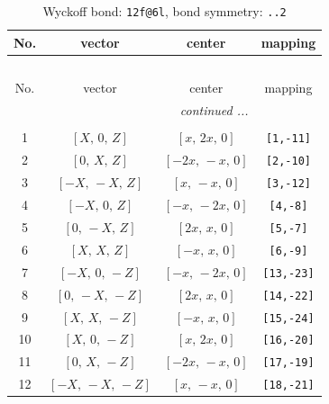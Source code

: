 \documentclass[fleqn,8pt]{jsarticle}
\begin{document}
\begin{longtable}{cccc}
\caption{Wyckoff bond: {\tt 12f@6l}, bond symmetry: {\tt ..2}}
 \\
 \hline \hline
No. & vector & center & mapping \\ \hline \endfirsthead

\multicolumn{3}{l}{\tablename\ \thetable{}} \\
 \hline \hline
No. & vector & center & mapping \\ \hline \endhead

 \hline \hline
\multicolumn{3}{r}{\footnotesize\it continued ...} \\ \endfoot

 \hline \hline
\multicolumn{3}{r}{} \\ \endlastfoot

1 & $\left[ X,\, 0,\, Z \right]$ & $\left[ x,\, 2 x,\, 0 \right]$ & {\tt [1,-11]} \\ \hline
2 & $\left[ 0,\, X,\, Z \right]$ & $\left[ - 2 x,\, - x,\, 0 \right]$ & {\tt [2,-10]} \\ \hline
3 & $\left[ - X,\, - X,\, Z \right]$ & $\left[ x,\, - x,\, 0 \right]$ & {\tt [3,-12]} \\ \hline
4 & $\left[ - X,\, 0,\, Z \right]$ & $\left[ - x,\, - 2 x,\, 0 \right]$ & {\tt [4,-8]} \\ \hline
5 & $\left[ 0,\, - X,\, Z \right]$ & $\left[ 2 x,\, x,\, 0 \right]$ & {\tt [5,-7]} \\ \hline
6 & $\left[ X,\, X,\, Z \right]$ & $\left[ - x,\, x,\, 0 \right]$ & {\tt [6,-9]} \\ \hline
7 & $\left[ - X,\, 0,\, - Z \right]$ & $\left[ - x,\, - 2 x,\, 0 \right]$ & {\tt [13,-23]} \\ \hline
8 & $\left[ 0,\, - X,\, - Z \right]$ & $\left[ 2 x,\, x,\, 0 \right]$ & {\tt [14,-22]} \\ \hline
9 & $\left[ X,\, X,\, - Z \right]$ & $\left[ - x,\, x,\, 0 \right]$ & {\tt [15,-24]} \\ \hline
10 & $\left[ X,\, 0,\, - Z \right]$ & $\left[ x,\, 2 x,\, 0 \right]$ & {\tt [16,-20]} \\ \hline
11 & $\left[ 0,\, X,\, - Z \right]$ & $\left[ - 2 x,\, - x,\, 0 \right]$ & {\tt [17,-19]} \\ \hline
12 & $\left[ - X,\, - X,\, - Z \right]$ & $\left[ x,\, - x,\, 0 \right]$ & {\tt [18,-21]} \\
\end{longtable}
\renewcommand{\arraystretch}{1.2}
\end{document}
